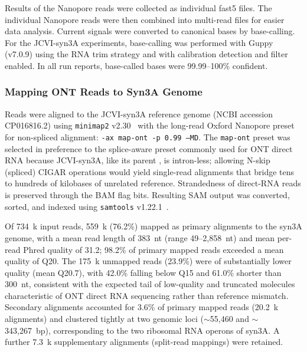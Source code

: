 Results of the Nanopore reads were collected as individual fast5 files.
The individual Nanopore reads were then combined into multi-read files for easier data analysis.
Current signals were converted to canonical bases by base-calling.
For the JCVI-syn3A experiments, base-calling was performed with Guppy (v7.0.9) using the RNA trim strategy and with calibration detection and filter enabled.
In all run reports, base-called bases were 99.99--100\% confident.

\subsubsection{Mapping ONT Reads to Syn3A Genome}


Reads were aligned to the JCVI-syn3A reference genome (NCBI accession CP016816.2) using \texttt{minimap2} v2.30~\cite{li_minimap2_2018} with the long-read Oxford Nanopore preset for non-spliced alignment: \texttt{-ax map-ont -p 0.99 --MD}.
The \texttt{map-ont} preset was selected in preference to the splice-aware preset commonly used for ONT direct RNA because JCVI-syn3A, like its parent \Mmy, is intron-less; allowing N-skip (spliced) CIGAR operations would yield single-read alignments that bridge tens to hundreds of kilobases of unrelated reference.
Strandedness of direct-RNA reads is preserved through the BAM flag bits.
Resulting SAM output was converted, sorted, and indexed using \texttt{samtools} v1.22.1~\cite{li_sequence_2009}.

Of 734~k input reads, 559~k (76.2\%) mapped as primary alignments to the syn3A genome, with a mean read length of 383~nt (range 49--2{,}858~nt) and mean per-read Phred quality of 31.2; 98.2\% of primary mapped reads exceeded a mean quality of Q20.
The 175~k unmapped reads (23.9\%) were of substantially lower quality (mean Q20.7), with 42.0\% falling below Q15 and 61.0\% shorter than 300~nt, consistent with the expected tail of low-quality and truncated molecules characteristic of ONT direct RNA sequencing rather than reference mismatch.
Secondary alignments accounted for 3.6\% of primary mapped reads (20.2~k alignments) and clustered tightly at two genomic loci ($\sim$55{,}460 and $\sim$343{,}267~bp), corresponding to the two ribosomal RNA operons of syn3A.
A further 7.3~k supplementary alignments (split-read mappings) were retained.


